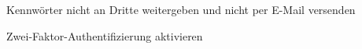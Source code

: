 \item Kennwörter nicht an Dritte weitergeben und nicht per E-Mail versenden
\item Zwei-Faktor-Authentifizierung aktivieren
